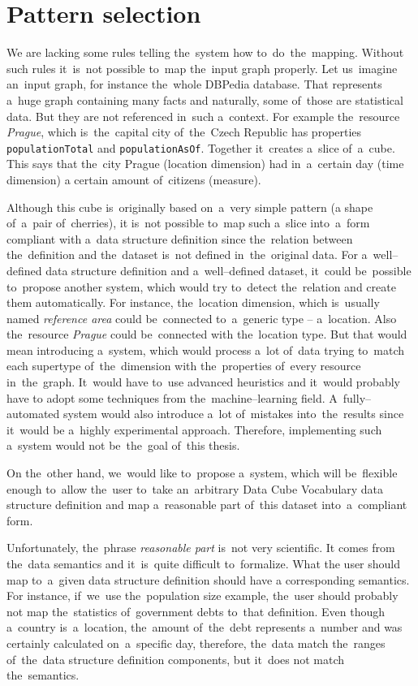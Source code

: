 \section{Pattern selection}
We are lacking some rules telling the~system how to~do~the~mapping. 
Without such rules it~is~not possible to~map the~input graph properly. Let us~imagine an~input graph, for instance the~whole DBPedia database. That represents a~huge graph 
containing many facts and naturally, some of~those are statistical data. But they 
are not referenced in~such a~context. For example the~resource \emph{Prague}, which is~the~capital city of~the~Czech Republic has properties \texttt{populationTotal} and
\texttt{populationAsOf}. Together it~creates a~slice of~a~cube. This says that the~city Prague (location dimension) had in~a~certain day (time dimension) 
a certain amount of~citizens (measure).

Although this cube is~originally based on~a~very simple pattern (a shape of~a~pair of~cherries),
it is~not possible to~map such a~slice into~a~form compliant with a~data structure definition since the~relation between the~definition and the~dataset is~not defined in~the~original data. For a~well--defined data structure 
definition and a~well--defined dataset, it~could be~possible to~propose another 
system, which would try to~detect the~relation and create them 
automatically. For instance, the~location dimension, which is~usually named
\emph{reference area} could be~connected to~a~generic type -- a~location.
Also the~resource \emph{Prague} could be~connected with the~location type. But 
that would mean introducing a~system, which would process a~lot of~data trying to~match each supertype of~the~dimension with the~properties of~every resource in~the~graph. It~would have to~use advanced heuristics and it~would probably have 
to adopt some techniques from the~machine--learning field. A~fully--automated 
system would also introduce a~lot of~mistakes into~the~results since it~would 
be a~highly experimental approach. Therefore, implementing such a~system would 
not be~the~goal of~this thesis. 

On the~other hand, we~would like to~propose a~system, which will be~flexible 
enough to~allow the~user to~take an~arbitrary Data Cube Vocabulary data 
structure definition and map a~reasonable part of~this dataset into~a~compliant 
form.

Unfortunately, the~phrase \emph{reasonable part} is~not very scientific. 
It comes from the~data semantics and it~is~quite difficult to~formalize. What 
the user should map to~a~given data structure definition should have 
a corresponding semantics. For instance, if~we~use the~population size example, the~user should probably not map the~statistics of~government debts to~that 
definition. Even though a~country is~a~location, the~amount of~the~debt represents a~number and was certainly calculated on~a~specific day, therefore, the~data match the~ranges of~the~data structure definition components, but it~does 
not match the~semantics.

